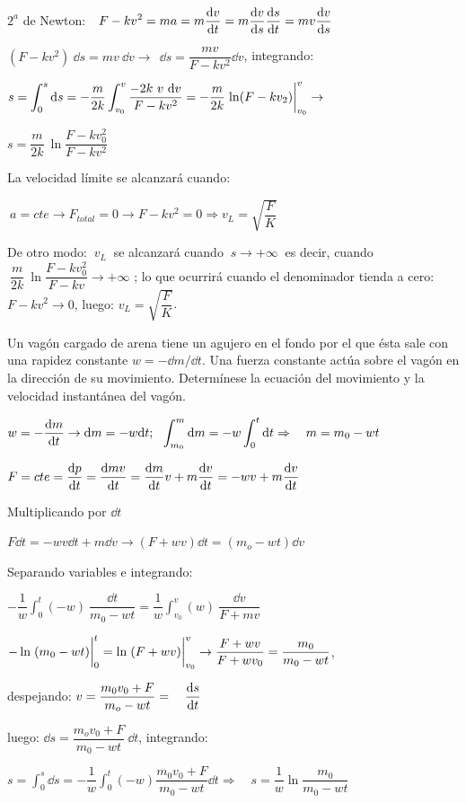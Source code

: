 $2^a$ de Newton: $\displaystyle \ \ F-kv^2=ma=m \dv{v}{t}=m\dv{v}{s} \dv{s}{t}=mv\dv{v}{s}$

$(F-kv^2)\ \dd s= mv\ \dd v \to \ \ \dd s=\dfrac{mv}{F-kv^2}\dd v$, integrando:

$s=\displaystyle \int_0^s \dd s= -\dfrac m{2k} \int_{v_0}^v \dfrac{-2k\ v\ \dd v}{F-kv^2} =-\dfrac m{2k} \eval{\ln (F-kv_2)}_{v_0}^v  \to$

$\displaystyle s=\dfrac m{2k} \ \ln \dfrac{F-kv_0^2}{F-kv^2}$

La velocidad límite se alcanzará cuando: 

$\ a=cte \to F_{total}=0 \to F-kv^2=0 \Rightarrow v_L=\sqrt{\dfrac{F}{K}}$

\textcolor{gris}{De otro modo: $\ v_L \ $ se alcanzará cuando $\ s\to +\infty \ $ es decir, cuando  $\ \dfrac m{2k} \ \ln \dfrac{F-kv_0^2}{F-kv} \to + \infty$ ; lo que ocurrirá cuando el denominador tienda a cero: $F-kv^2 \to 0$, luego: $v_L=\sqrt{\dfrac{F}{K}}$}.

\begin{prob}
Un vagón cargado de arena tiene un agujero en el fondo por el que ésta sale con una rapidez constante $w=-\dd m / \dd t$. Una fuerza constante actúa sobre el vagón en la dirección de su movimiento. Determínese la ecuación del movimiento y la velocidad instantánea del vagón.	
\end{prob}

$\displaystyle w=-\dv{m}{t} \to \dd m = -w \dd t ;\ \ \int_{m_0}^m \dd m=-w \int_0^t \dd t \Rightarrow \quad m=m_0-wt$

$\displaystyle F=cte=\dv{p}{t}=\dv{mv}{t}=\dv{m}{t}v+m\dv{v}{t}=-wv+m\dv{v}{t}$

Multiplicando por $\dd t$ 

$\displaystyle F\dd t=-wv\dd t + m \dd v \to (F+wv)\dd t=(m_o-wt)\dd v$

Separando variables e integrando: 

$\displaystyle - \dfrac 1 w \int_0^t (-w)\ \dfrac{\dd t}{m_0-wt}=\dfrac 1 w \int_{v_0}^v (w) \ \dfrac{\dd v}{F+mv}$

$\displaystyle -\ln \eval{(m_0-wt)}_0^t=\ln \eval{(F+wv)}_{v_0}^v \to
\dfrac{F+wv}{F+wv_0}=\dfrac{m_0}{m_0-wt}$, 

despejando:
$\displaystyle v=\dfrac{m_0v_0+F}{m_o-wt}=\quad \dv{s}{t}$

luego: $\displaystyle \dd s= \dfrac{m_ov_0+F}{m_0-wt} \ \dd t$, integrando:

$\displaystyle s=\int_0^s \dd s= -\dfrac 1 w \int_0^t (-w) \dfrac{m_0v_0+F}{m_0-wt} \dd t \Rightarrow \quad s=\dfrac 1 w \ln \dfrac {m_0}{m_0-wt}$

